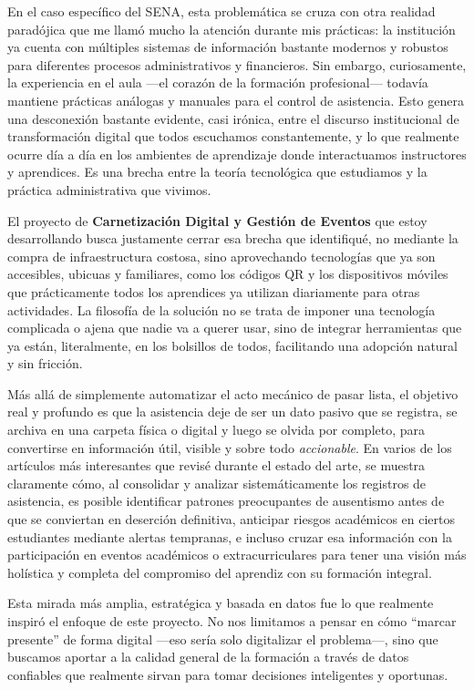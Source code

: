 En el caso específico del SENA, esta problemática se cruza con otra realidad paradójica que me llamó mucho la atención durante mis prácticas: la institución ya cuenta con múltiples sistemas de información bastante modernos y robustos para diferentes procesos administrativos y financieros. Sin embargo, curiosamente, la experiencia en el aula —el corazón de la formación profesional— todavía mantiene prácticas análogas y manuales para el control de asistencia. Esto genera una desconexión bastante evidente, casi irónica, entre el discurso institucional de transformación digital que todos escuchamos constantemente, y lo que realmente ocurre día a día en los ambientes de aprendizaje donde interactuamos instructores y aprendices. Es una brecha entre la teoría tecnológica que estudiamos y la práctica administrativa que vivimos.

El proyecto de \textbf{Carnetización Digital y Gestión de Eventos} que estoy desarrollando busca justamente cerrar esa brecha que identifiqué, no mediante la compra de infraestructura costosa, sino aprovechando tecnologías que ya son accesibles, ubicuas y familiares, como los códigos QR y los dispositivos móviles que prácticamente todos los aprendices ya utilizan diariamente para otras actividades. La filosofía de la solución no se trata de imponer una tecnología complicada o ajena que nadie va a querer usar, sino de integrar herramientas que ya están, literalmente, en los bolsillos de todos, facilitando una adopción natural y sin fricción.

Más allá de simplemente automatizar el acto mecánico de pasar lista, el objetivo real y profundo es que la asistencia deje de ser un dato pasivo que se registra, se archiva en una carpeta física o digital y luego se olvida por completo, para convertirse en información útil, visible y sobre todo \textit{accionable}. En varios de los artículos más interesantes que revisé durante el estado del arte, se muestra claramente cómo, al consolidar y analizar sistemáticamente los registros de asistencia, es posible identificar patrones preocupantes de ausentismo antes de que se conviertan en deserción definitiva, anticipar riesgos académicos en ciertos estudiantes mediante alertas tempranas, e incluso cruzar esa información con la participación en eventos académicos o extracurriculares para tener una visión más holística y completa del compromiso del aprendiz con su formación integral.

Esta mirada más amplia, estratégica y basada en datos fue lo que realmente inspiró el enfoque de este proyecto. No nos limitamos a pensar en cómo ``marcar presente'' de forma digital —eso sería solo digitalizar el problema—, sino que buscamos aportar a la calidad general de la formación a través de datos confiables que realmente sirvan para tomar decisiones inteligentes y oportunas. 

